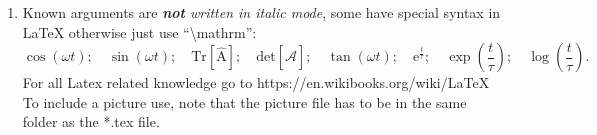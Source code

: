 \documentclass[11pt,fleqn]{article}
\newcommand{\eexp}{\mbox{e}^}
\begin{document}
\begin{enumerate}
\item Known arguments are \textit{{\bf not} written in  italic mode}, some have special syntax in LaTeX otherwise just  use ``\textbackslash mathrm'': 
\begin{equation}
\cos (\omega t); \quad  \sin (\omega t);\quad  \mathrm{Tr \left[ \hat A\right] };\quad  \mathrm{det \left[ \hat {\mathcal{A}} \right] }; \quad \tan(\omega t); \quad  \eexp{\frac{t}{\tau}};\quad  \exp{\left(\frac{t}{\tau}\right)}; \quad \log\left(\frac{t}{\tau}\right).
\end{equation}For all Latex related knowledge go to https://en.wikibooks.org/wiki/LaTeX\\
To include a picture use, note that the picture file has to be in the same folder as the *.tex file.

\end{enumerate}

\end{document}

